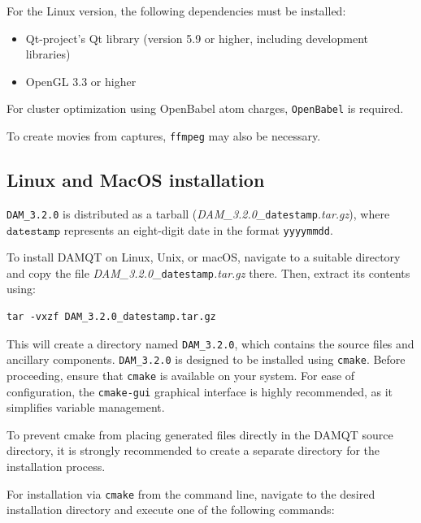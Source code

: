 \documentclass[10pt]{article}
\begin{document}
For the Linux version, the following dependencies must be installed:
\begin{itemize}
\item Qt-project's Qt library (version 5.9 or higher, including development libraries)
\item OpenGL 3.3 or higher
\end{itemize}

For cluster optimization using OpenBabel atom charges, \texttt{OpenBabel} is required.

To create movies from captures, \texttt{ffmpeg} may also be necessary.

\subsection{Linux and MacOS installation \label{sec:1.1}}

\texttt{DAM\_3.2.0} is distributed as a tarball
({\it DAM\_3.2.0\_}\texttt{datestamp}{\it .tar.gz}),
where $\texttt{datestamp}$ represents an eight-digit date in the format \texttt{yyyymmdd}.

To install DAMQT on Linux, Unix, or macOS, navigate to a suitable directory and copy the file
{\it DAM\_3.2.0\_}\texttt{datestamp}{\it .tar.gz} there. Then, extract its contents using:
\begin{verbatim}
tar -vxzf DAM_3.2.0_datestamp.tar.gz
\end{verbatim}

This will create a directory named \texttt{DAM\_3.2.0}, which contains the source files and ancillary components.
\texttt{DAM\_3.2.0} is designed to be installed using \texttt{cmake}.
Before proceeding, ensure that \texttt{cmake} is available on your system.
For ease of configuration, the \texttt{cmake-gui} graphical interface is highly recommended, as it simplifies variable management.

To prevent cmake from placing generated files directly in the DAMQT source directory,
it is strongly recommended to create a separate directory for the installation process.

For installation via \texttt{cmake} from the command line, navigate to the desired installation directory and execute one of the following commands:
\end{document}
